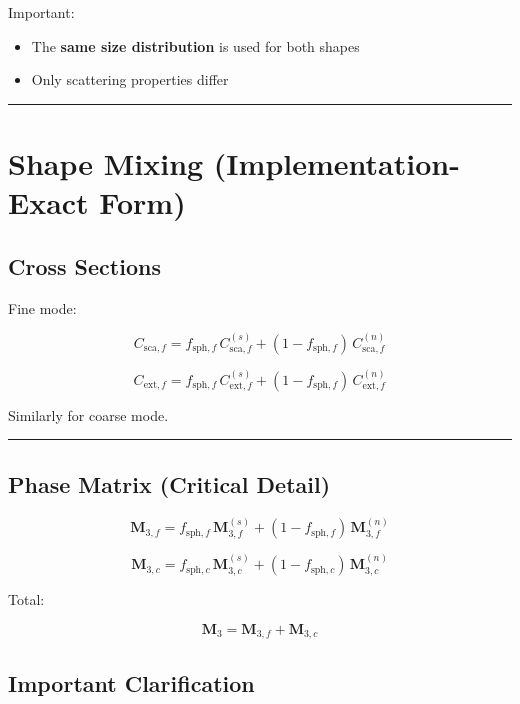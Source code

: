 \documentclass[
  letterpaper,
]{scrbook}
\providecommand{\tightlist}{%
  \setlength{\itemsep}{0pt}\setlength{\parskip}{0pt}}
\begin{document}
Important:

\begin{itemize}
\tightlist
\item
  The \textbf{same size distribution} is used for both shapes\\
\item
  Only scattering properties differ
\end{itemize}

\begin{center}\rule{0.5\linewidth}{0.5pt}\end{center}

\section{Shape Mixing (Implementation-Exact
Form)}\label{shape-mixing-implementation-exact-form}

\subsection{Cross Sections}\label{cross-sections-1}

Fine mode:

\[
C_{\text{sca},f}
=
f_{\text{sph},f}\, C_{\text{sca},f}^{(s)}
+
(1-f_{\text{sph},f})\, C_{\text{sca},f}^{(n)}
\]

\[
C_{\text{ext},f}
=
f_{\text{sph},f}\, C_{\text{ext},f}^{(s)}
+
(1-f_{\text{sph},f})\, C_{\text{ext},f}^{(n)}
\]

Similarly for coarse mode.

\begin{center}\rule{0.5\linewidth}{0.5pt}\end{center}

\subsection{Phase Matrix (Critical
Detail)}\label{phase-matrix-critical-detail}

\[
\mathbf{M}_{3,f}
=
f_{\text{sph},f}\, \mathbf{M}_{3,f}^{(s)}
+
(1-f_{\text{sph},f})\, \mathbf{M}_{3,f}^{(n)}
\]

\[
\mathbf{M}_{3,c}
=
f_{\text{sph},c}\, \mathbf{M}_{3,c}^{(s)}
+
(1-f_{\text{sph},c})\, \mathbf{M}_{3,c}^{(n)}
\]

Total:

\[
\mathbf{M}_3 = \mathbf{M}_{3,f} + \mathbf{M}_{3,c}
\]

\subsection{Important Clarification}\label{important-clarification}
\end{document}
